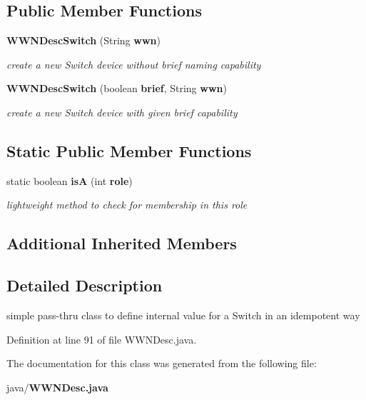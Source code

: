 \subsection*{Public Member Functions}
\begin{DoxyCompactItemize}
\item 
{\bf W\+W\+N\+Desc\+Switch} (String {\bf wwn})\label{classorg_1_1smallfoot_1_1wwn_1_1WWNDesc_1_1WWNDescSwitch_a2e9d7b44477f5ca43f315dcf26d1fa55}

\begin{DoxyCompactList}\small\item\em create a new Switch device without brief naming capability \end{DoxyCompactList}\item 
{\bf W\+W\+N\+Desc\+Switch} (boolean {\bf brief}, String {\bf wwn})\label{classorg_1_1smallfoot_1_1wwn_1_1WWNDesc_1_1WWNDescSwitch_aae944684c83002cfaae951cbfff7505d}

\begin{DoxyCompactList}\small\item\em create a new Switch device with given brief capability \end{DoxyCompactList}\end{DoxyCompactItemize}
\subsection*{Static Public Member Functions}
\begin{DoxyCompactItemize}
\item 
static boolean {\bf is\+A} (int {\bf role})\label{classorg_1_1smallfoot_1_1wwn_1_1WWNDesc_1_1WWNDescSwitch_a6530bfb83544e64d2c13e7f32784eff2}

\begin{DoxyCompactList}\small\item\em lightweight method to check for membership in this role \end{DoxyCompactList}\end{DoxyCompactItemize}
\subsection*{Additional Inherited Members}


\subsection{Detailed Description}
simple pass-\/thru class to define internal value for a Switch in an idempotent way 

Definition at line 91 of file W\+W\+N\+Desc.\+java.



The documentation for this class was generated from the following file\+:\begin{DoxyCompactItemize}
\item 
java/{\bf W\+W\+N\+Desc.\+java}\end{DoxyCompactItemize}
